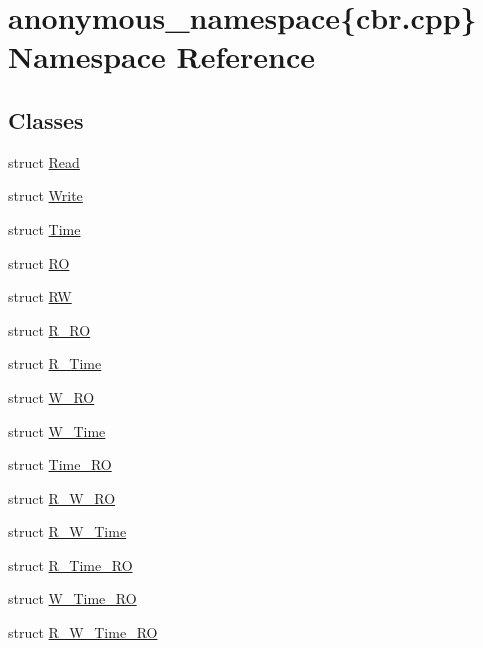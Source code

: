 \hypertarget{namespaceanonymous__namespace_02cbr_8cpp_03}{\section{anonymous\-\_\-namespace\{cbr.\-cpp\} Namespace Reference}
\label{namespaceanonymous__namespace_02cbr_8cpp_03}
}
\subsection*{Classes}
\begin{DoxyCompactItemize}
\item 
struct \hyperlink{structanonymous__namespace_02cbr_8cpp_03_1_1Read}{Read}
\item 
struct \hyperlink{structanonymous__namespace_02cbr_8cpp_03_1_1Write}{Write}
\item 
struct \hyperlink{structanonymous__namespace_02cbr_8cpp_03_1_1Time}{Time}
\item 
struct \hyperlink{structanonymous__namespace_02cbr_8cpp_03_1_1RO}{R\-O}
\item 
struct \hyperlink{structanonymous__namespace_02cbr_8cpp_03_1_1RW}{R\-W}
\item 
struct \hyperlink{structanonymous__namespace_02cbr_8cpp_03_1_1R__RO}{R\-\_\-\-R\-O}
\item 
struct \hyperlink{structanonymous__namespace_02cbr_8cpp_03_1_1R__Time}{R\-\_\-\-Time}
\item 
struct \hyperlink{structanonymous__namespace_02cbr_8cpp_03_1_1W__RO}{W\-\_\-\-R\-O}
\item 
struct \hyperlink{structanonymous__namespace_02cbr_8cpp_03_1_1W__Time}{W\-\_\-\-Time}
\item 
struct \hyperlink{structanonymous__namespace_02cbr_8cpp_03_1_1Time__RO}{Time\-\_\-\-R\-O}
\item 
struct \hyperlink{structanonymous__namespace_02cbr_8cpp_03_1_1R__W__RO}{R\-\_\-\-W\-\_\-\-R\-O}
\item 
struct \hyperlink{structanonymous__namespace_02cbr_8cpp_03_1_1R__W__Time}{R\-\_\-\-W\-\_\-\-Time}
\item 
struct \hyperlink{structanonymous__namespace_02cbr_8cpp_03_1_1R__Time__RO}{R\-\_\-\-Time\-\_\-\-R\-O}
\item 
struct \hyperlink{structanonymous__namespace_02cbr_8cpp_03_1_1W__Time__RO}{W\-\_\-\-Time\-\_\-\-R\-O}
\item 
struct \hyperlink{structanonymous__namespace_02cbr_8cpp_03_1_1R__W__Time__RO}{R\-\_\-\-W\-\_\-\-Time\-\_\-\-R\-O}

\end{DoxyCompactItemize}
